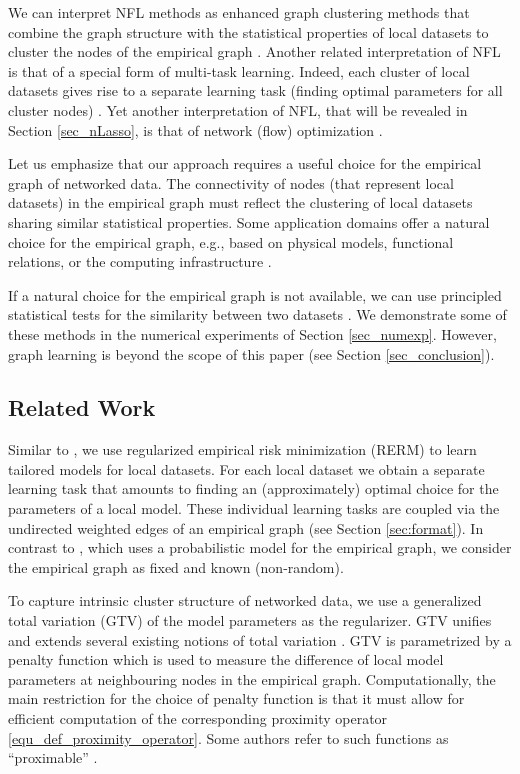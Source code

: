 \documentclass[lettersize,journal]{IEEEtran}
\begin{document}
We can interpret NFL methods as enhanced graph clustering methods that combine the graph structure 
with the statistical properties of local datasets to cluster the nodes of the empirical graph \cite{Luxburg2007}. 
Another related interpretation of NFL is that of a special form of multi-task learning. Indeed, each cluster of local 
datasets gives rise to a separate learning task (finding optimal parameters for all cluster nodes) \cite{NIPS2008_fccb3cdc}. 
Yet another interpretation of NFL, that will be revealed in Section \ref{sec_nLasso}, is that of network (flow) optimization \cite{BertsekasNetworkOpt,RockNetworks}.

Let us emphasize that our approach requires a useful choice for the empirical graph of networked data. 
The connectivity of nodes (that represent local datasets) in the empirical graph must reflect 
the clustering of local datasets sharing similar statistical properties. Some application domains 
offer a natural choice for the empirical graph, e.g., based on physical models, functional relations, 
or the computing infrastructure \cite{NewmannBook}. 

If a natural choice for the empirical graph is not available, we can use principled statistical tests 
for the similarity between two datasets \cite{CSGraphSelJournal}. We demonstrate some of these 
methods in the numerical experiments of Section \ref{sec_numexp}. However, graph learning is beyond 
the scope of this paper (see Section \ref{sec_conclusion}). 

\vspace*{-3mm}
\subsection{Related Work}

Similar to \cite{NetworkLasso,LocalizedLinReg2019,Smith2017,Nassif2020,Xu2011}, 
we use regularized empirical risk minimization (RERM) to learn tailored models for local datasets. 
For each local dataset we obtain a separate learning task that amounts to finding 
an (approximately) optimal choice for the parameters of a local model. These individual 
learning tasks are coupled via the undirected weighted edges of an empirical graph (see Section \ref{sec:format}). 
In contrast to \cite{Xu2011}, which uses a probabilistic model for the empirical graph, 
we consider the empirical graph as fixed and known (non-random). 

To capture intrinsic cluster structure of networked data, we use a generalized total 
variation (GTV) of the 
model parameters as the regularizer. GTV unifies and extends several existing notions 
of total variation \cite{NetworkLasso,LocalizedLinReg2019,Smith2017,Nassif2020}. 
GTV is parametrized by a penalty function which is used to measure the difference of local model 
parameters at neighbouring nodes in the empirical graph. Computationally, the main restriction for 
the choice of penalty function is that it must allow for efficient computation of the corresponding proximity  
operator \eqref{equ_def_proximity_operator}. Some authors refer to such functions as ``proximable'' \cite{Condat2013}. 
\end{document}
